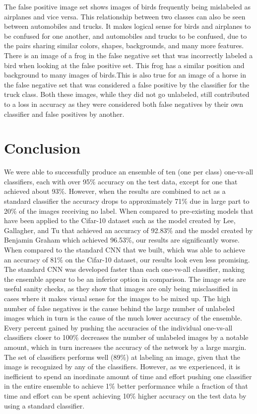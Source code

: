 \documentclass[10pt,twocolumn,letterpaper]{article}
\begin{document}
The false positive image set shows images of birds frequently being mislabeled as airplanes and vice versa. This relationship between two classes can also be seen between automobiles and trucks. It makes logical sense for birds and airplanes to be confused for one another, and automobiles and trucks to be confused, due to the pairs sharing similar colors, shapes, backgrounds, and many more features. There is an image of a frog in the false negative set that was incorrectly labeled a bird when looking at the false positive set. This frog has a similar position and background to many images of birds.This is also true for an image of a horse in the false negative set that was considered a false positive by the classifier for the truck class. Both these images, while they did not go unlabeled, still contributed to a loss in accuracy as they were considered both false negatives by their own classifier and false positives by another.


\section{Conclusion}
We were able to successfully produce an ensemble of ten (one per class) one-vs-all classifiers, each with over 95\% accuracy on the test data, except for one that achieved about 93\%. However, when the results are combined to act as a standard classifier the accuracy drops to approximately 71\% due in large part to 20\% of the images receiving no label. When compared to pre-existing models that have been applied to the Cifar-10 dataset such as the model created by Lee, Gallagher, and Tu that achieved an accuracy of 92.83\% and the model created by Benjamin Graham which achieved 96.53\%, our results are significantly worse.  When compared to the standard CNN that we built, which was able to achieve an accuracy of 81\% on the Cifar-10 dataset, our results look even less promising. The standard CNN was developed faster than each one-vs-all classifier, making the ensemble appear to be an inferior option in comparison. The image sets are useful sanity checks, as they show that images are only being misclassified in cases where it makes visual sense for the images to be mixed up. The high number of false negatives is the cause behind the large number of unlabeled images which in turn is the cause of the much lower accuracy of the ensemble. Every percent gained by pushing the accuracies of the individual one-vs-all classifiers closer to 100\% decreases the number of unlabeled images by a notable amount, which in turn increases the accuracy of the network by a large margin. The set of classifiers performs well (89\%) at labeling an image, given that the image is recognized by any of the classifiers. However, as we experienced, it is inefficient to spend an inordinate amount of time and effort pushing one classifier in the entire ensemble to achieve 1\% better performance while a fraction of that time and effort can be spent achieving 10\% higher accuracy on the test data by using a standard classifier.
\end{document}
